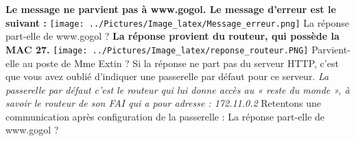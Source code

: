 \documentclass[10pt,a4paper]{article}
\begin{document}
\bigbreak
\textbf{Le message ne parvient pas à www.gogol. Le message d'erreur est le suivant :}
\bigbreak
\texttt{[image: ../Pictures/Image\_latex/Message\_erreur.png]} 
\bigbreak
La réponse part-elle de www.gogol ?
\medbreak
\textbf{La réponse provient du routeur, qui possède la MAC 27.}
\medbreak
\texttt{[image: ../Pictures/Image\_latex/reponse\_routeur.PNG]} 
\bigbreak
Parvient-elle au poste de Mme Extin ?
\medbreak
\textbf{\lipsum}
\bigbreak
Si la réponse ne part pas du serveur HTTP, c’est que vous avez oublié d’indiquer une passerelle par défaut pour ce serveur.
\medbreak
\textit{La passerelle par défaut c’est le routeur qui lui donne accès au « reste du monde », à savoir le routeur de son FAI qui a pour adresse : 172.11.0.2}
\bigbreak
Retentons une communication après configuration de la passerelle :
\medbreak
La réponse part-elle de www.gogol ?
\end{document}
